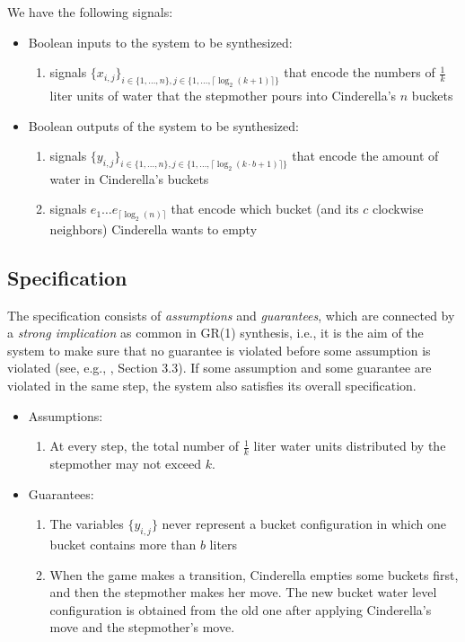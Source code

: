 \documentclass[a4paper,conference,10pt]{IEEEtran}
\begin{document}
\noindent We have the following signals:
\begin{itemize}
\item Boolean inputs to the system to be synthesized:
\begin{enumerate}
\item signals $\{\mathit{x}_{i,j}\}_{i \in \{1, \ldots, n\}, j \in \{1, \ldots, \lceil \log_2(k+1) \rceil \}}$ that encode the numbers of $\frac{1}{k}$ liter units of water that the stepmother pours into Cinderella's $n$ buckets
\end{enumerate}
\item Boolean outputs of the system to be synthesized:
\begin{enumerate}
\item signals $\{\mathit{y}_{i,j}\}_{i \in \{1, \ldots, n\}, j \in \{1, \ldots, \lceil \log_2(k \cdot b+1) \rceil \}}$ that encode the amount of water in Cinderella's  buckets
\item signals $e_1 \ldots e_{\lceil \log_2(n)\rceil}$ that encode which bucket (and its $c$ clockwise neighbors) Cinderella wants to empty
\end{enumerate}
\end{itemize}

\subsection{Specification}
\noindent The specification consists of \emph{assumptions} and \emph{guarantees}, which are connected by a \emph{strong implication} as common in GR(1) synthesis, i.e., it is the aim of the system to make sure that no guarantee is violated before some assumption is violated (see, e.g., \cite{DBLP:journals/jcss/BloemJPPS12}, Section 3.3). If some assumption and some guarantee are violated in the same step, the system also satisfies its overall specification.
\begin{itemize}
\item Assumptions:
\begin{enumerate}
\item At every step, the total number of $\frac{1}{k}$ liter water units distributed by the stepmother may not exceed $k$.
\end{enumerate}
\item Guarantees:
\begin{enumerate}
\item The variables $\{\mathit{y}_{i,j}\}$ never represent a bucket configuration in which one bucket contains more than $b$ liters
\item When the game makes a transition, Cinderella empties some buckets first, and then the stepmother makes her move. The new bucket water level configuration is obtained from the old one after applying Cinderella's move and the stepmother's move.
\end{enumerate}
\end{itemize}
\end{document}
